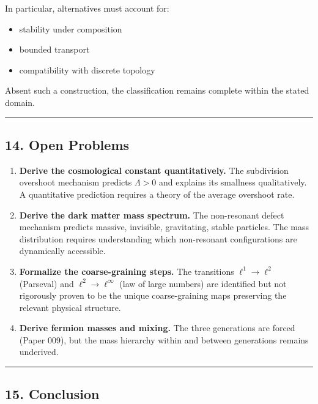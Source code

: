 \documentclass[
]{article}
\providecommand{\tightlist}{%
  \setlength{\itemsep}{0pt}\setlength{\parskip}{0pt}}
\begin{document}
In particular, alternatives must account for:

\begin{itemize}
\tightlist
\item
  stability under composition
\item
  bounded transport
\item
  compatibility with discrete topology
\end{itemize}

Absent such a construction, the classification remains complete within
the stated domain.

\begin{center}\rule{0.5\linewidth}{0.5pt}\end{center}

\hypertarget{open-problems}{%
\subsection{14. Open Problems}\label{open-problems}}

\begin{enumerate}
\def\labelenumi{\arabic{enumi}.}
\item
  \textbf{Derive the cosmological constant quantitatively.} The
  subdivision overshoot mechanism predicts \(\Lambda > 0\) and explains
  its smallness qualitatively. A quantitative prediction requires a
  theory of the average overshoot rate.
\item
  \textbf{Derive the dark matter mass spectrum.} The non-resonant defect
  mechanism predicts massive, invisible, gravitating, stable particles.
  The mass distribution requires understanding which non-resonant
  configurations are dynamically accessible.
\item
  \textbf{Formalize the coarse-graining steps.} The transitions
  \(\ell^1 \to \ell^2\) (Parseval) and \(\ell^2 \to \ell^\infty\) (law
  of large numbers) are identified but not rigorously proven to be the
  unique coarse-graining maps preserving the relevant physical
  structure.
\item
  \textbf{Derive fermion masses and mixing.} The three generations are
  forced (Paper 009), but the mass hierarchy within and between
  generations remains underived.
\end{enumerate}

\begin{center}\rule{0.5\linewidth}{0.5pt}\end{center}

\hypertarget{conclusion}{%
\subsection{15. Conclusion}\label{conclusion}}
\end{document}
